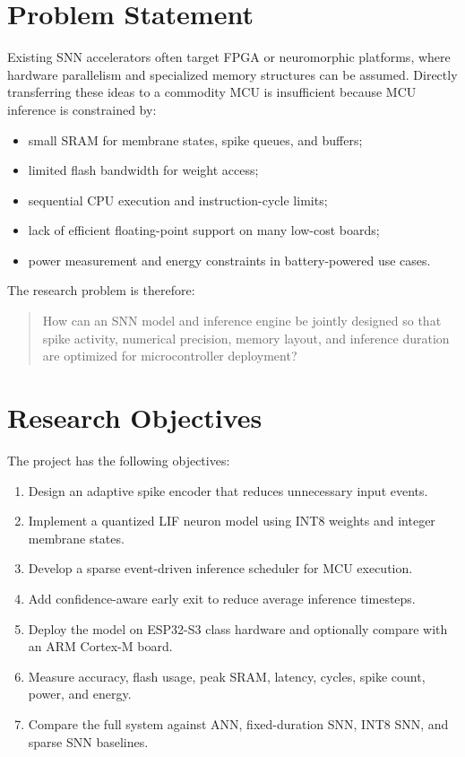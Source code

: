 \documentclass[12pt]{article}
\begin{document}
\section{Problem Statement}
Existing SNN accelerators often target FPGA or neuromorphic platforms, where hardware parallelism and specialized memory structures can be assumed. Directly transferring these ideas to a commodity MCU is insufficient because MCU inference is constrained by:
\begin{itemize}
    \item small SRAM for membrane states, spike queues, and buffers;
    \item limited flash bandwidth for weight access;
    \item sequential CPU execution and instruction-cycle limits;
    \item lack of efficient floating-point support on many low-cost boards;
    \item power measurement and energy constraints in battery-powered use cases.
\end{itemize}

The research problem is therefore:
\begin{quote}
How can an SNN model and inference engine be jointly designed so that spike activity, numerical precision, memory layout, and inference duration are optimized for microcontroller deployment?
\end{quote}

\section{Research Objectives}
The project has the following objectives:
\begin{enumerate}
    \item Design an adaptive spike encoder that reduces unnecessary input events.
    \item Implement a quantized LIF neuron model using INT8 weights and integer membrane states.
    \item Develop a sparse event-driven inference scheduler for MCU execution.
    \item Add confidence-aware early exit to reduce average inference timesteps.
    \item Deploy the model on ESP32-S3 class hardware and optionally compare with an ARM Cortex-M board.
    \item Measure accuracy, flash usage, peak SRAM, latency, cycles, spike count, power, and energy.
    \item Compare the full system against ANN, fixed-duration SNN, INT8 SNN, and sparse SNN baselines.
\end{enumerate}
\end{document}
